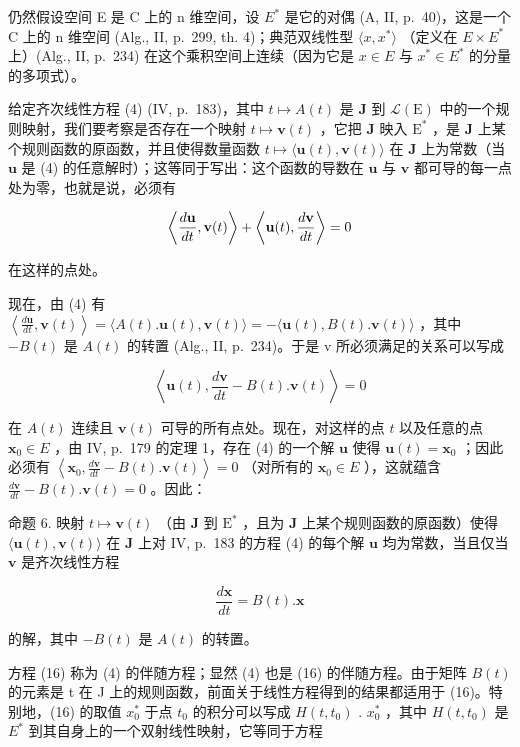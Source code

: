 仍然假设空间 E 是 C 上的 n 维空间，设 \(E^{*}\) 是它的对偶 (A, II, p.~40)，这是一个 C 上的 n 维空间 (Alg., II, p.~299, th. 4)；典范双线性型 \(\langle x, x^{*}\rangle\) （定义在 \(E \times E^{*}\) 上）(Alg., II, p.~234) 在这个乘积空间上连续（因为它是 \(x \in E\) 与 \(x^{*} \in E^{*}\) 的分量的多项式）。

给定齐次线性方程 (4) (IV, p.~183)，其中 \(t \mapsto A(t)\) 是 \(\mathbf{J}\) 到 \(\mathcal{L}(\mathrm{E})\) 中的一个规则映射，我们要考察是否存在一个映射 \(t \mapsto \mathbf{v}(t)\) ，它把 \(\mathbf{J}\) 映入 \(\mathrm{E}^*\) ，是 \(\mathbf{J}\) 上某个规则函数的原函数，并且使得数量函数 \(t \mapsto \langle \mathbf{u}(t), \mathbf{v}(t) \rangle\) 在 \(\mathbf{J}\) 上为常数（当 \(\mathbf{u}\) 是 (4) 的任意解时）；这等同于写出：这个函数的导数在 \(\mathbf{u}\) 与 \(\mathbf{v}\) 都可导的每一点处为零，也就是说，必须有

\[
\left\langle \frac {d {\bf u}}{d t}, {\bf v} (t) \right\rangle + \left\langle {\bf u} (t), \frac {d {\bf v}}{d t} \right\rangle = 0
\]

在这样的点处。

现在，由 (4) 有 \(\left\langle\frac{d\mathbf{u}}{dt},\mathbf{v}(t)\right\rangle=\langle A(t).\mathbf{u}(t),\mathbf{v}(t)\rangle=-\langle\mathbf{u}(t),B(t).\mathbf{v}(t)\rangle\) ，其中 \(-B(t)\) 是 \(A(t)\) 的转置 (Alg., II, p.~234)。于是 v 所必须满足的关系可以写成

\[
\left\langle \mathbf {u} (t), \frac {d \mathbf {v}}{d t} - B (t). \mathbf {v} (t) \right\rangle = 0
\]

在 \(A(t)\) 连续且 \(\mathbf{v}(t)\) 可导的所有点处。现在，对这样的点 \(t\) 以及任意的点 \(\mathbf{x}_0 \in E\) ，由 IV, p.~179 的定理 1，存在 (4) 的一个解 \(\mathbf{u}\) 使得 \(\mathbf{u}(t) = \mathbf{x}_0\) ；因此必须有 \(\left\langle \mathbf{x}_0, \frac{d\mathbf{v}}{dt} - B(t).\mathbf{v}(t) \right\rangle = 0\) （对所有的 \(\mathbf{x}_0 \in E\) ），这就蕴含 \(\frac{d\mathbf{v}}{dt} - B(t).\mathbf{v}(t) = 0\) 。因此：

命题 6. 映射 \(t \mapsto \mathbf{v}(t)\) （由 \(\mathbf{J}\) 到 \(\mathrm{E}^*\) ，且为 \(\mathbf{J}\) 上某个规则函数的原函数）使得 \(\langle \mathbf{u}(t), \mathbf{v}(t) \rangle\) 在 \(\mathbf{J}\) 上对 IV, p.~183 的方程 (4) 的每个解 \(\mathbf{u}\) 均为常数，当且仅当 \(\mathbf{v}\) 是齐次线性方程

\[
{\frac {d \mathbf {x}}{d t}} = B (t). \mathbf {x}\tag{16}
\]

的解，其中 \(-B(t)\) 是 \(A(t)\) 的转置。

方程 (16) 称为 (4) 的伴随方程；显然 (4) 也是 (16) 的伴随方程。由于矩阵 \(B(t)\) 的元素是 t 在 J 上的规则函数，前面关于线性方程得到的结果都适用于 (16)。特别地，(16) 的取值 \(x_{0}^{*}\) 于点 \(t_{0}\) 的积分可以写成 \(H(t, t_{0})\) . \(x_{0}^{*}\) ，其中 \(H(t, t_{0})\) 是 \(E^{*}\) 到其自身上的一个双射线性映射，它等同于方程


